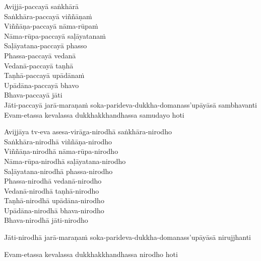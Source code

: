 \begin{pali-hang-continued}
Avijjā-paccayā saṅkhārā\\
Saṅkhāra-paccayā viññāṇaṁ\\
Viññāṇa-paccayā nāma-rūpaṁ\\
Nāma-rūpa-paccayā saḷāyatanaṁ\\
Saḷāyatana-paccayā phasso\\
Phassa-paccayā vedanā\\
Vedanā-paccayā taṇhā\\
Taṇhā-paccayā upādānaṁ\\
Upādāna-paccayā bhavo\\
Bhava-paccayā jāti\\
Jāti-paccayā jarā-maraṇaṁ soka-parideva-dukkha-domanass'upāyāsā sambhavanti\\
Evam-etassa kevalassa dukkhakkhandhassa samudayo hoti
\end{pali-hang-continued}

\begin{pali-hang-continued}
Avijjāya tv-eva asesa-virāga-nirodhā saṅkhāra-nirodho\\
Saṅkhāra-nirodhā viññāṇa-nirodho\\
Viññāṇa-nirodhā nāma-rūpa-nirodho\\
Nāma-rūpa-nirodhā saḷāyatana-nirodho\\
Saḷāyatana-nirodhā phassa-nirodho\\
Phassa-nirodhā vedanā-nirodho\\
Vedanā-nirodhā taṇhā-nirodho\\
Taṇhā-nirodhā upādāna-nirodho\\
Upādāna-nirodhā bhava-nirodho\\
Bhava-nirodhā jāti-nirodho
\begin{pali-hangtogether}
Jāti-nirodhā jarā-maraṇaṁ soka-parideva-dukkha-domanass'upāyāsā nirujjhanti
\end{pali-hangtogether}
\begin{pali-hangtogether}
Evam-etassa kevalassa dukkhakkhandhassa nirodho hoti
\end{pali-hangtogether}
\end{pali-hang-continued}

